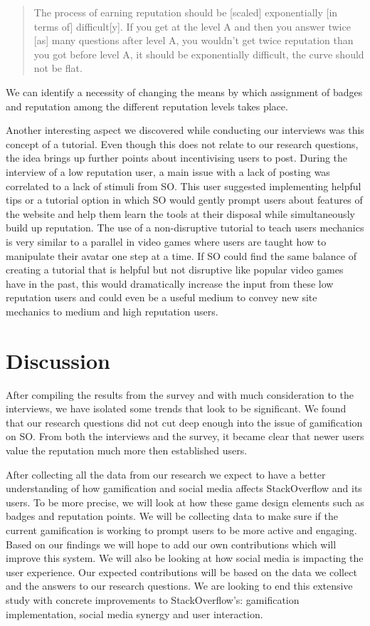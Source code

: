 \documentclass{sigchi}
\begin{document}
\blockquote{The process of earning reputation should be [scaled] exponentially [in terms of] difficult[y]. If you get at the level A and then you answer twice [as] many questions after level A, you wouldn’t get twice reputation than you got before level A, it should be exponentially difficult, the curve should not be flat.}

We can identify a necessity of changing the means by which assignment of  badges and reputation among the different reputation levels takes place.

Another interesting aspect we discovered while conducting our interviews was this concept of a tutorial. Even though this does not relate to our research questions, the idea brings up further points about incentivising users to post. During the interview of a low reputation user, a main issue with a lack of posting was correlated to a lack of stimuli from SO. This user suggested implementing helpful tips or a tutorial option in which SO would gently prompt users about features of the website and help them learn the tools at their disposal while simultaneously build up reputation. The use of a non-disruptive tutorial to teach users mechanics is very similar to a parallel in video games where users are taught how to manipulate their avatar one step at a time. If SO could find the same balance of creating a tutorial that is helpful but not disruptive like popular video games have in the past, this would dramatically increase the input from these low reputation users and could even be a useful medium to convey new site mechanics to medium and high reputation users. 

\section{Discussion}

After compiling the results from the survey and with much consideration to the interviews, we have isolated some trends that look to be significant. We found that our research questions did not cut deep enough into the issue of gamification on SO. From both the interviews and the survey, it became clear that newer users value the reputation much more then established users. 

After collecting all the data from our research we expect to have a better understanding of how gamification and social media affects StackOverflow and its users. To be more precise, we will look at how these game design elements such as badges and reputation points. We will be collecting data to make sure if the current gamification is working to prompt users to be more active and engaging. Based on our findings we will hope to add our own contributions which will improve this system. We will also be looking at how social media is impacting the user experience. Our expected contributions will be based on the data we collect and the answers to our research questions. We are looking to end this extensive study with concrete improvements to StackOverflow’s: gamification implementation, social media synergy and user interaction.
\end{document}
